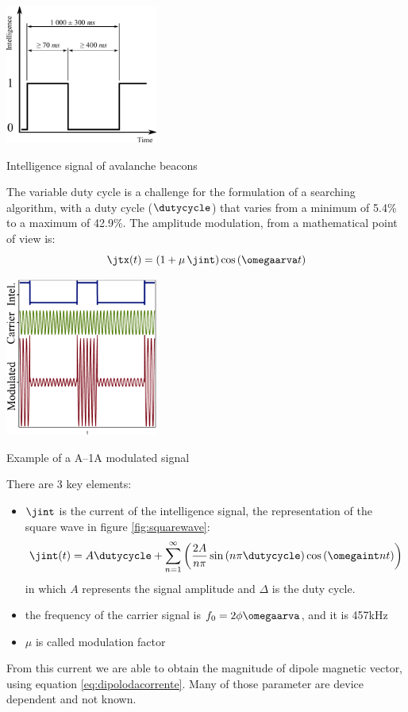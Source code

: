 \begin{marginfigure}
	\centering
	\includegraphics[width=5cm]{ch1/img/artva_signal.pdf}
	\caption{Intelligence signal of avalanche beacons}
	\label{fig:squarewaves}
\end{marginfigure}

The variable duty cycle is a challenge for the formulation of a searching algorithm, with a duty cycle ($\dutycycle$) that varies from a minimum of 5.4\% to a maximum of 42.9\%. The amplitude modulation, from a mathematical point of view is:
\begin{equation}
\jtx(t) = \braces{1+\mu \,\jint}\ccos{\omegaarva t}
\end{equation}
\begin{marginfigure}
	\centering
	\includegraphics[width=5cm]{ch2/img/modulation_example.pdf}
	\caption{Example of a A--1A modulated signal}
\end{marginfigure}
There are 3 key elements:
\begin{itemize}
\item $\jint$ is the current of the intelligence signal, the representation of the square wave in figure \ref{fig:squarewave}:
\begin{equation}
\jint(t) = A\dutycycle + \sum\limits_{n=1}^{\infty}\braces{\dfrac{2A}{n\pi}\ssin{n\pi \dutycycle} \ccos{\omegaint n t}}
\end{equation}
in which $A$ represents the signal amplitude and $\Delta$ is the duty cycle. 
\item the frequency of the carrier signal is $f_0 = 2\phi\omegaarva$, and it is \num{457}\si{\kilo\hertz}
\item $\mu$ is called modulation factor
\end{itemize}
From this current we are able to obtain the magnitude of dipole magnetic vector, using equation \ref{eq:dipolodacorrente}. Many of those parameter are device dependent and not known.



\clearpage



